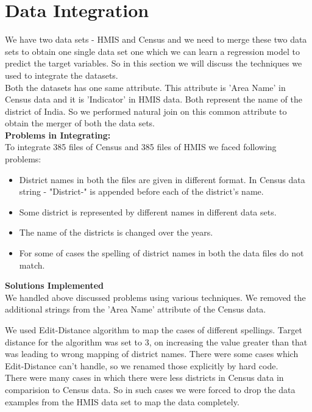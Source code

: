 \documentclass[12pt]{article}
\begin{document}
\section{Data Integration}

We have two data sets - HMIS and Census and we need to merge these two data sets to obtain one single data set one which we can learn a regression model to predict the target variables. So in this section we will discuss the techniques we used to integrate the datasets.\\

Both the datasets has one same attribute. This attribute is 'Area Name' in Census data and it is 'Indicator' in HMIS data. Both represent the name of the district of India. So we performed natural join on this common attribute to obtain the merger of both the data sets.\\

\textbf{Problems in Integrating:}\\
To integrate 385 files of Census and 385 files of HMIS we faced following problems:
\begin{itemize}
	\item District names in both the files are given in different format. In Census data string - "District-" is appended before each of the district's name.
	\item Some district is represented by different names in different data sets.
	\item The name of the districts is changed over the years.
	\item For some of cases the spelling of district names in both the data files do not match.
\end{itemize}

\bigskip
\textbf{Solutions Implemented}\\
We handled above discussed problems using various techniques. We removed the additional strings from the 'Area Name' attribute of the Census data. 

We used Edit-Distance algorithm to map the cases of different spellings. Target distance for the algorithm was set to 3, on increasing the value greater than that was leading to wrong mapping of district names. There were some cases which Edit-Distance can't handle, so we renamed those explicitly by hard code. \\

There were many cases in which there were less districts in Census data in comparision to Census data. So in such cases we were forced to drop the data examples from the HMIS data set to map the data completely.
\end{document}
